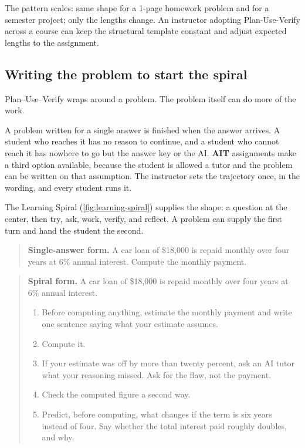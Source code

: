 \documentclass{SIAMbook2023}
\newcommand{\AIT}{\textcolor{catAIT}{\textbf{AIT}}}
\begin{document}
The pattern scales: same shape for a 1-page homework problem and for a semester project; only the lengths change. An instructor adopting Plan-Use-Verify across a course can keep the structural template constant and adjust expected lengths to the assignment.

\subsection{Writing the problem to start the spiral}
\label{i:subsec:spiral-problems}%

Plan--Use--Verify wraps around a problem. The problem itself can do more of the work.

A problem written for a single answer is finished when the answer arrives. A student who reaches it has no reason to continue, and a student who cannot reach it has nowhere to go but the answer key or the AI. \AIT{} assignments make a third option available, because the student is allowed a tutor and the problem can be written on that assumption. The instructor sets the trajectory once, in the wording, and every student runs it.

The Learning Spiral (\cref{fig:learning-spiral}) supplies the shape: a question at the center, then try, ask, work, verify, and reflect. A problem can supply the first turn and hand the student the second.

\begin{quote}
\textbf{Single-answer form.} A car loan of \$18{,}000 is repaid monthly over four years at 6\% annual interest. Compute the monthly payment.
\end{quote}

\begin{quote}
\textbf{Spiral form.} A car loan of \$18{,}000 is repaid monthly over four years at 6\% annual interest.
\begin{enumerate}
\item Before computing anything, estimate the monthly payment and write one sentence saying what your estimate assumes.
\item Compute it.
\item If your estimate was off by more than twenty percent, ask an AI tutor what your reasoning missed. Ask for the flaw, not the payment.
\item Check the computed figure a second way.
\item Predict, before computing, what changes if the term is six years instead of four. Say whether the total interest paid roughly doubles, and why.
\end{enumerate}
\end{quote}
\end{document}
